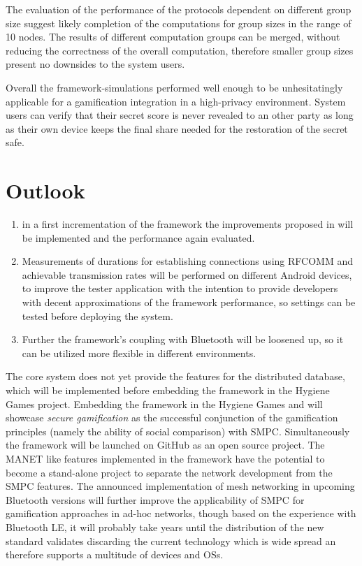 The evaluation of the performance of the protocols dependent on different group size suggest likely completion of the computations for group sizes in the range of 10 nodes. The results of different computation groups can be merged, without reducing the correctness of the overall computation, therefore smaller group sizes present no downsides to the system users.

Overall the framework-simulations performed well enough to be unhesitatingly applicable for a gamification integration in a high-privacy environment. System users can verify that their secret score is never revealed to an other party as long as their own device keeps the final share needed for the restoration of the secret safe.

\section{Outlook}

\begin{enumerate}
	\item in a first incrementation of the framework the improvements proposed in  will be implemented and the performance again evaluated.
	\item Measurements of durations for establishing connections using \gls{RFCOMM} and achievable transmission rates will be performed on different Android devices, to improve the tester application with the intention to provide developers with decent approximations of the framework performance, so settings can be tested before deploying the system. 
	\item Further the framework's coupling with Bluetooth will be loosened up, so it can be utilized more flexible in different environments.
\end{enumerate}

The core system does not yet provide the features for the distributed database, which will be implemented before embedding the framework in the Hygiene Games project. Embedding the framework in the Hygiene Games and will showcase \textit{secure gamification} as the successful conjunction of the gamification principles (namely the ability of social comparison) with \gls{SMPC}. Simultaneously the framework will be launched on GitHub as an open source project.
The \gls{MANET} like features implemented in the framework have the potential to become a stand-alone project to separate the network development from the \gls{SMPC} features. The announced implementation of mesh networking in upcoming Bluetooth versions will further improve the applicability of \gls{SMPC} for gamification approaches in ad-hoc networks, though based on the experience with Bluetooth LE, it will probably take years until the distribution of the new standard validates discarding the current technology which is wide spread an therefore supports a multitude of devices and \glspl{OS}.

